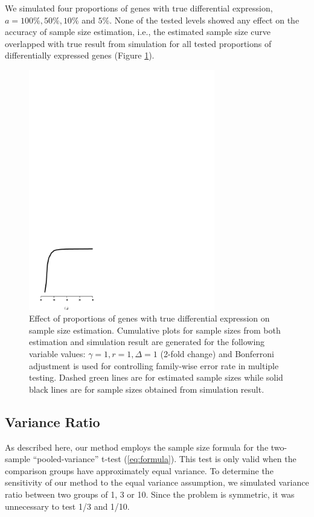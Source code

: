 \documentclass{bioinfo}
\begin{document}
We simulated four proportions of genes with true differential
expression, $a = 100\%, 50\%, 10\%$ and $5\%$. None of the tested
levels showed any effect on the accuracy of sample size
estimation, i.e., the estimated sample size curve overlapped with
true result from simulation for all tested proportions of
differentially expressed genes (Figure \ref{fig:ResAlt}).

\begin{figure}[h]
  \centerline{\includegraphics*[width=3.2in]{ResAlt.pdf}}
  \caption[Effect of proportions of genes with true differential expression on sample size estimation]
  {Effect of proportions of genes with true differential expression on sample size estimation.
    Cumulative plots for sample sizes from both estimation and simulation result
    are generated for the following variable values: $\gamma = 1, r = 1, \Delta = 1$ (2-fold
    change) and Bonferroni adjustment is used for controlling family-wise error rate in multiple testing. Dashed green lines are for estimated sample sizes
    while solid black lines are for sample sizes obtained from simulation result.}
  \label{fig:ResAlt}
\end{figure}

\subsection{Variance Ratio}

As described here, our method employs the sample size formula for
the two-sample ``pooled-variance'' t-test (\ref{eq:formula}).
This test is only valid when the comparison groups have
approximately equal variance. To determine the sensitivity of our
method to the equal variance assumption, we simulated variance
ratio between two groups of 1, 3 or 10.  Since the problem is
symmetric, it was unnecessary to test 1/3 and 1/10.
\end{document}
